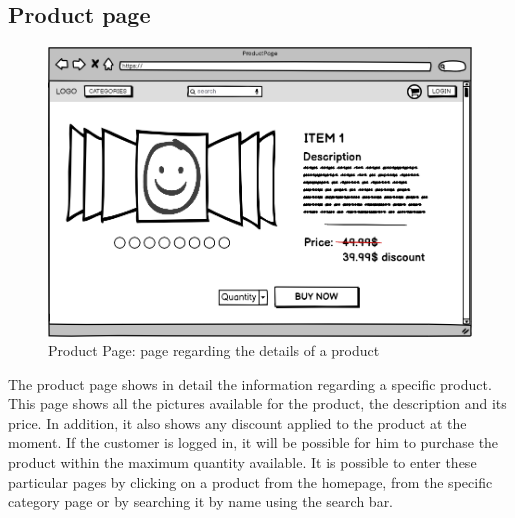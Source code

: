 \subsection{Product page}
    \begin{figure}[H]
        \centering
        \includegraphics[width=\textwidth,height=0.7\textheight,keepaspectratio]{mockups/productPageMockup.png}
            \caption{Product Page: page regarding the details of a product}
            \label{fig:ProductPage}
    \end{figure}

The product page shows in detail the information regarding a specific product.
This page shows all the pictures available for the product, the description and its price.
In addition, it also shows any discount applied to the product at the moment.
If the customer is logged in, it will be possible for him to purchase the product within the maximum quantity available. It is possible to enter these particular pages by clicking on a product from the homepage, from the specific category page or by searching it by name using the search bar.

